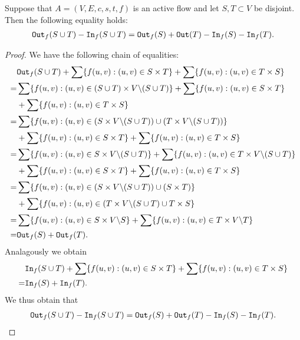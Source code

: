 \documentclass{article}
\begin{document}
\begin{lemma}\label{strange_algebraic_property}
    Suppose that $A = (V, E, c, s, t, f)$ is an active flow and let $S, T \subset V$ be disjoint. Then the following equality holds:
    \begin{align*}
        \texttt{Out}_f(S \cup T) - \texttt{In}_f(S \cup T) = \texttt{Out}_f(S) + \texttt{Out}(T) - \texttt{In}_f(S) - \texttt{In}_f(T).
    \end{align*}
\end{lemma}
\begin{proof}
    We have the following chain of equalities:
    \begin{align*}
        &\texttt{Out}_f(S \cup T) + \sum \{f(u, v) : (u, v) \in S \times T\} + \sum \{f(u, v) : (u, v) \in T \times S\}\\
        =&\sum \{f(u, v) : (u, v) \in (S \cup T) \times V \backslash (S \cup T)\} + \sum \{f(u, v) : (u, v) \in S \times T\}\\
        &+ \sum \{f(u, v) : (u, v) \in T \times S\}\\
        =& \sum \{f(u, v) : (u, v) \in (S \times V \backslash (S \cup T)) \cup (T \times V \backslash (S \cup T))\}\\
        &+ \sum \{f(u, v) : (u, v) \in S \times T\} + \sum \{f(u, v) : (u, v) \in T \times S\}\\
        =& \sum \{f(u, v) : (u, v) \in S \times V \backslash (S \cup T)\} + \sum \{f(u, v) : (u, v) \in T \times V \backslash (S \cup T)\}\\
        &+ \sum \{f(u, v) : (u, v) \in S \times T\} + \sum \{f(u, v) : (u, v) \in T \times S\}\\
        =& \sum \{f(u, v) : (u, v) \in (S \times V \backslash (S \cup T)) \cup (S \times T)\}\\
        &+ \sum \{f(u, v) : (u, v) \in (T \times V \backslash (S \cup T) \cup T \times S\}\\
        =& \sum \{f(u, v) : (u, v) \in S \times V \backslash S\}
        + \sum \{f(u, v) : (u, v) \in T \times V \backslash T\}\\
        =& \texttt{Out}_f(S) + \texttt{Out}_f(T).
    \end{align*}
    Analagously we obtain
    \begin{align*}
        &\texttt{In}_f(S \cup T) + \sum \{f(u, v) : (u, v) \in S \times T\} + \sum \{f(u, v) : (u, v) \in T \times S\}\\
        =& \texttt{In}_f(S) + \texttt{In}_f(T).
    \end{align*}
    We thus obtain that \begin{align*}
        \texttt{Out}_f(S \cup T) - \texttt{In}_f(S \cup T) = \texttt{Out}_f(S) + \texttt{Out}_f(T) - \texttt{In}_f(S) - \texttt{In}_f(T).
    \end{align*}
\end{proof}
\end{document}

